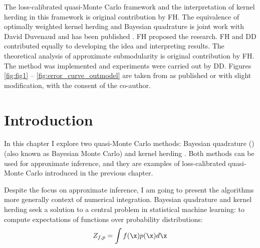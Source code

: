 
\begin{summarycontributions}
The loss-calibrated quasi-Monte Carlo framework and the interpretation of kernel herding in this framework is original contribution by FH. The equivalence of optimally weighted kernel herding and Bayesian quadrature is joint work with David Duvenaud and has been published \citep{Huszar2012herding}. FH proposed the research. FH and DD contributed equally to developing the idea and interpreting results. The theoretical analysis of approximate submodularity is original contribution by FH. The method was implemented and experiments were carried out by DD. Figures \ref{fig:fig1} -- \ref{fig:error_curve_outmodel} are taken from \citep{Huszar2012herding} as published or with slight modification, with the consent of the co-author.
\end{summarycontributions}


\section{Introduction}

In this chapter I explore two quasi-Monte Carlo methods: Bayesian quadrature (\bq{}) \citep{BZHermiteQuadrature,BZMonteCarlo} (also known as Bayesian Monte Carlo) and kernel herding \citep{chen2010super}. Both methods can be used for approximate inference, and they are examples of loss-calibrated quasi-Monte Carlo introduced in the previous chapter.

Despite the focus on approximate inference, I am going to present the algorithms more generally context of numerical integration. Bayesian quadrature and kernel herding seek a solution to a central problem in statistical machine learning: to compute expectations of functions over probability distributions:
\begin{equation}
	Z_{f,p} = \int f(\x) p(\x) d\x \label{eqn:integral}
\end{equation}


